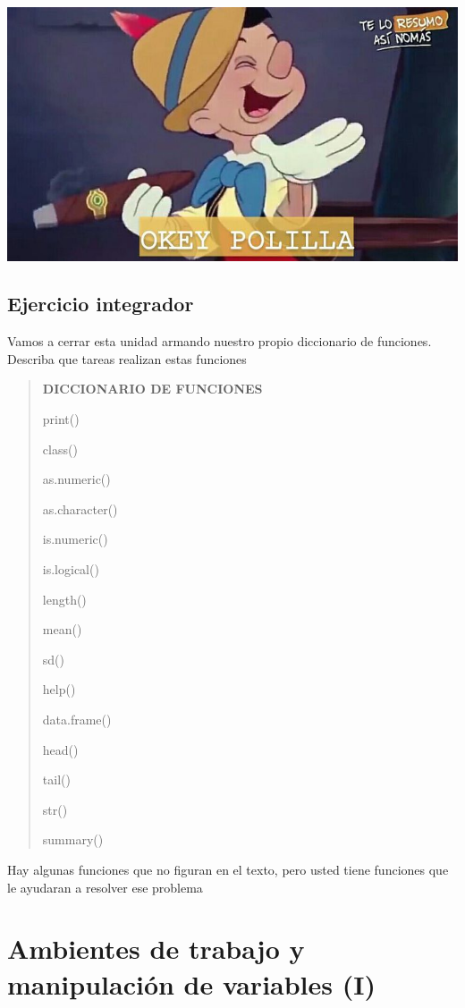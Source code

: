 \documentclass[
]{book}
\begin{document}
\includegraphics[width=10in]{img/pollilla}

\hypertarget{ejercicio-integrador-1}{%
\section{\texorpdfstring{ Ejercicio integrador}{ Ejercicio integrador}}\label{ejercicio-integrador-1}}

Vamos a cerrar esta unidad armando nuestro propio diccionario de funciones. Describa que tareas realizan estas funciones

\begin{quote}
\textbf{DICCIONARIO DE FUNCIONES}

print()

class()

as.numeric()

as.character()

is.numeric()

is.logical()

length()

mean()

sd()

help()

data.frame()

head()

tail()

str()

summary()
\end{quote}

Hay algunas funciones que no figuran en el texto, pero usted tiene funciones que le ayudaran a resolver ese problema

\hypertarget{ambientes-de-trabajo-y-manipulaciuxf3n-de-variables-i}{%
\chapter{Ambientes de trabajo y manipulación de variables (I)}\label{ambientes-de-trabajo-y-manipulaciuxf3n-de-variables-i}}
\end{document}
